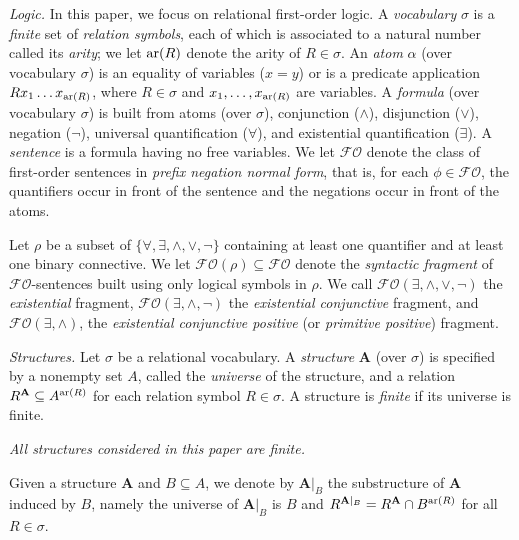 \documentclass[usletter]{article}
\newcommand{\fo}{\mathcal{FO}}
\newcommand{\rela}{\mathbf{A}}
\begin{document}
\medskip

\noindent \textit{Logic.} In this paper, we focus on relational first-order logic.  
A \emph{vocabulary} $\sigma$ is a \emph{finite} set of \emph{relation symbols}, 
each of which is associated to a natural number called its
\emph{arity}; we let $\textup{ar}(R)$ denote the arity of $R \in \sigma$.  
An \emph{atom} $\alpha$ (over vocabulary $\sigma$) is an equality of variables ($x=y$) 
or is a predicate application $R x_1 \dots x_{\textup{ar}(R)}$, 
where $R \in \sigma$ and $x_1,\dots,x_{\textup{ar}(R)}$ are variables.  
A \emph{formula} (over vocabulary $\sigma$) is built from atoms (over $\sigma$), 
conjunction ($\wedge$), disjunction ($\vee$), negation ($\neg$), 
universal quantification ($\forall$), and existential quantification ($\exists$).  
A \emph{sentence} is a formula having no free variables.  We let $\fo$ 
denote the class of first-order sentences in \emph{prefix negation normal form}, 
that is, for each $\phi \in \fo$, 
the quantifiers occur in front of the sentence and the negations occur in front of the atoms.  


Let $\rho$ be a subset of $\{\forall,\exists,\wedge,\vee,\neg\}$ 
containing at least one quantifier and at least one binary connective.  
We let $\fo(\rho) \subseteq \fo$ denote the \emph{syntactic fragment} of $\fo$-sentences 
built using only logical symbols in $\rho$.  We call 
$\fo(\exists,\wedge,\vee,\neg)$ the \emph{existential} fragment, 
$\fo(\exists,\wedge,\neg)$ the \emph{existential conjunctive} fragment, 
and $\fo(\exists,\wedge)$, the \emph{existential conjunctive positive} (or \emph{primitive positive}) fragment.  
 
\medskip

\noindent \textit{Structures.}  
Let $\sigma$ be a relational vocabulary.  A \emph{structure} $\rela$ (over $\sigma$) is specified by 
a nonempty set $A$, called the \emph{universe} of the structure, 
and a relation $R^{\rela} \subseteq A^{\textup{ar}(R)}$ for each relation symbol $R \in \sigma$.  
A structure is \emph{finite} if its universe is finite.  

\emph{All structures considered in this paper are finite.} 


Given a structure $\mathbf{A}$ 
and $B \subseteq A$, we denote by $\mathbf{A}|_B$ the substructure of $\mathbf{A}$ induced by $B$, 
namely the universe of $\mathbf{A}|_B$ is $B$ and $R^{\mathbf{A}|_B}=R^{\mathbf{A}} \cap B^{\textup{ar}(R)}$ 
for all $R \in \sigma$.
\end{document}
